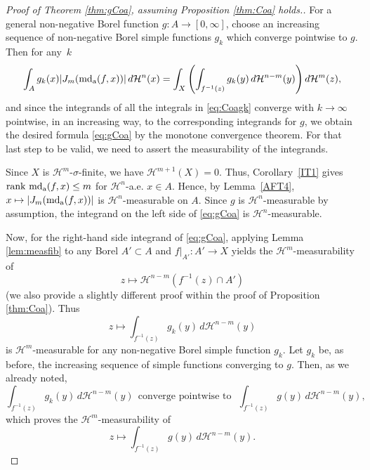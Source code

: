 \documentclass[12pt,leqno]{amsart}
\theoremstyle{definition}
\def\H{{\mathcal H}}
\def\rank{{\rm rank\,}}
\def\apmd{\operatorname{md_{\rm a}}}
\numberwithin{theorem}{section} \numberwithin{equation}{section}
\begin{document}
\begin{proof}[Proof of Theorem \ref{thm:gCoa}, assuming Proposition \ref{thm:Coa} holds.]
For a general non-negative Borel function $g:A\to[0,\infty]$, choose an increasing
sequence of non-negative Borel simple functions $g_k$ which converge pointwise to $g$. Then for any~$k$
\begin{equation}\label{eq:Coagk}
    \int_{A} g_k(x)|J_m(\apmd(f,x))|\,d\H^n(x)=\int_X\left(\int_{f^{-1}(z)}g_k(y)\,d\H^{n-m}(y)\right)d\H^m(z),
\end{equation}
and since the integrands of all the integrals in \eqref{eq:Coagk} converge with $k\to\infty$ pointwise, in an increasing way, to the corresponding integrands for $g$,  we obtain the desired formula \eqref{eq:gCoa} by the monotone convergence theorem. For that last step to be valid, we need to assert the measurability of the  integrands.

Since $X$ is $\H^m$-$\sigma$-finite, we have $\H^{m+1}(X)=0$. Thus, Corollary~\ref{IT1} gives $\rank \apmd (f,x)\leq m$ for $\H^n$-a.e. $x\in A$. Hence, by Lemma~\ref{AFT4}, $x\mapsto |J_m(\apmd(f,x))|$ is $\H^n$-measurable on $A$. Since $g$ is $\H^n$-measurable by assumption, the integrand on the left side of \eqref{eq:gCoa} is $\H^n$-measurable.

Now, for the right-hand side integrand of \eqref{eq:gCoa}, applying Lemma \ref{lem:measfib} to any Borel $A'\subset A$ and $f|_{A'}:A'\to X$ yields the $\H^m$-measurability of  $$z\mapsto \H^{n-m}(f^{-1}(z)\cap A')$$ (we also provide a slightly different proof within the proof of Proposition \ref{thm:Coa}). Thus
$$
z\mapsto \int_{f^{-1}(z)}g_k(y)\,d\H^{n-m}(y)
$$
is $\H^m$-measurable for any non-negative Borel simple function $g_k$. Let $g_k$ be, as before, the increasing sequence of simple functions converging to $g$. Then, as we already noted,
$$
\int_{f^{-1}(z)}g_k(y)\,d\H^{n-m}(y)~~\text{converge pointwise to~~}\int_{f^{-1}(z)}g(y)\,d\H^{n-m}(y),
$$
which proves the $\H^m$-measurability of
$$
z\mapsto \int_{f^{-1}(z)}g(y)\,d\H^{n-m}(y).
$$
\end{proof}
\end{document}
